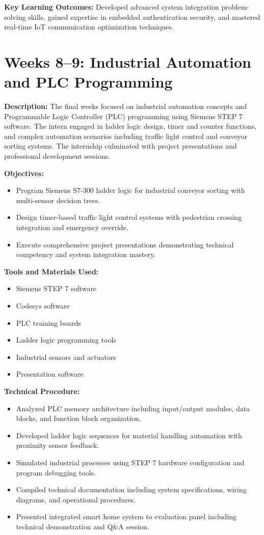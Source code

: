 \documentclass[12pt,a4paper]{report}
\begin{document}
\noindent\textbf{Key Learning Outcomes:} Developed advanced system integration problem-solving skills, gained expertise in embedded authentication security, and mastered real-time IoT communication optimization techniques.

\section{Weeks 8--9: Industrial Automation and PLC Programming}

\textbf{Description:} The final weeks focused on industrial automation concepts and Programmable Logic Controller (PLC) programming using Siemens STEP 7 software. The intern engaged in ladder logic design, timer and counter functions, and complex automation scenarios including traffic light control and conveyor sorting systems. The internship culminated with project presentations and professional development sessions.

\textbf{Objectives:}
\begin{itemize}
    \item Program Siemens S7-300 ladder logic for industrial conveyor sorting with multi-sensor decision trees.
    \item Design timer-based traffic light control systems with pedestrian crossing integration and emergency override.
    \item Execute comprehensive project presentations demonstrating technical competency and system integration mastery.
\end{itemize}

\textbf{Tools and Materials Used:}
\begin{multicols}{2}
\begin{itemize}
    \item Siemens STEP 7 software
    \item Codesys software
    \item PLC training boards
    \item Ladder logic programming tools
    \item Industrial sensors and actuators
    \item Presentation software
\end{itemize}
\end{multicols}

\textbf{Technical Procedure:}
\begin{itemize}
    \item Analyzed PLC memory architecture including input/output modules, data blocks, and function block organization.
    \item Developed ladder logic sequences for material handling automation with proximity sensor feedback.
    \item Simulated industrial processes using STEP 7 hardware configuration and program debugging tools.
    \item Compiled technical documentation including system specifications, wiring diagrams, and operational procedures.
    \item Presented integrated smart home system to evaluation panel including technical demonstration and Q\&A session.
\end{itemize}
\end{document}
